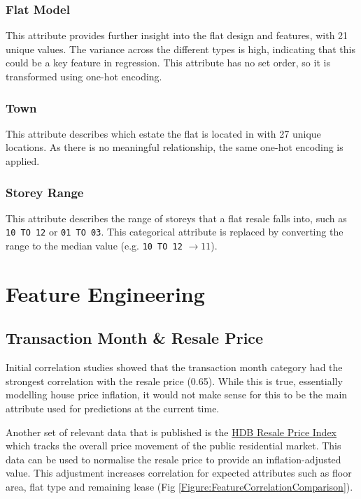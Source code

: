 \documentclass[[12pt,conference]{IEEEtran}
\begin{document}
\subsubsection{Flat Model}
This attribute provides further insight into the flat design and features, with 21 unique values. The variance across the different types is high, indicating that this could be a key feature in regression. This attribute has no set order, so it is transformed using one-hot encoding. 

\subsubsection{Town}
This attribute describes which estate the flat is located in with 27 unique locations. As there is no meaningful relationship, the same one-hot encoding is applied. 

\subsubsection{Storey Range}
This attribute describes the range of storeys that a flat resale falls into, such as \texttt{10 TO 12} or \texttt{01 TO 03}. This categorical attribute is replaced by converting the range to the median value (e.g. \texttt{10 TO 12} $\to 11$).

\section{Feature Engineering}
\subsection{Transaction Month \& Resale Price}
Initial correlation studies showed that the transaction month category had the strongest correlation with the resale price (0.65). While this is true, essentially modelling house price inflation, it would not make sense for this to be the main attribute used for predictions at the current time. 

Another set of relevant data that is published is the \href{https://data.gov.sg/dataset/hdb-resale-price-index?view_id=14c47d07-1395-4661-8466-728abce27f5f&resource_id=52e93430-01b7-4de0-80df-bc83d0afed40}{HDB Resale Price Index} which tracks the overall price movement of the public residential market. This data can be used to normalise the resale price to provide an inflation-adjusted value. This adjustment increases correlation for expected attributes such as floor area, flat type and remaining lease (Fig \ref{Figure:FeatureCorrelationComparison}).
\end{document}
